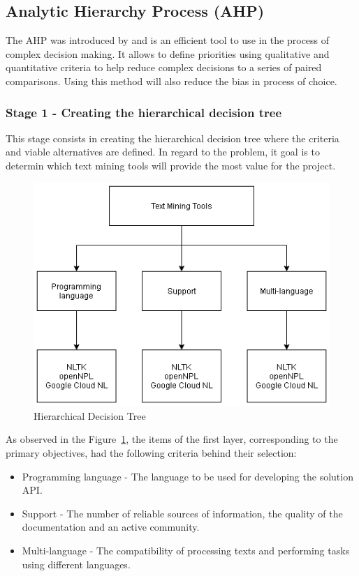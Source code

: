 \subsection{Analytic Hierarchy Process (AHP)}

The \gls{AHP} was introduced by \textcite{saaty_1987} and is an efficient tool to use in the process of complex decision making.
It allows to define priorities using qualitative and quantitative criteria to help reduce complex decisions to a series of paired comparisons.
Using this method will also reduce the bias in process of choice.

\subsubsection{Stage 1 - Creating the hierarchical decision tree}

This stage consists in creating the hierarchical decision tree where the criteria and viable alternatives are defined.
In regard to the problem, it goal is to determin which text mining tools will provide the most value for the project.

\begin{figure}[H]
\centering
\includegraphics[scale=0.5]{ch3/assets/AHP.png}
\caption[Hierarchical Decision Tree]{Hierarchical Decision Tree}
\label{fig:AHP}
\end{figure}

As observed in the Figure~\ref{fig:AHP}, the items of the first layer, corresponding to the primary objectives, had the following criteria behind their selection:

\begin{itemize}
    \item Programming language - The language to be used for developing the solution \gls{API}.
    \item Support - The number of reliable sources of information, the quality of the documentation and an active community.
    \item Multi-language - The compatibility of processing texts and performing tasks using different languages. 
\end{itemize}

